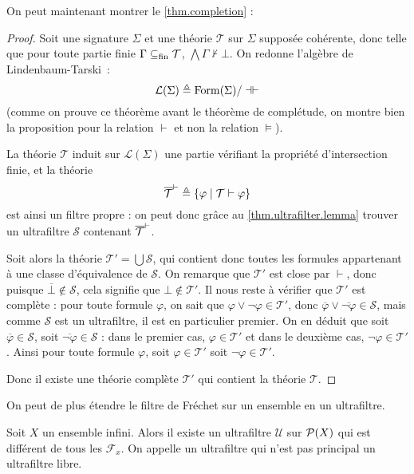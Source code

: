 On peut maintenant montrer le \cref{thm.completion} :

\begin{proof}
  Soit une signature $\Sigma$ et une théorie $\mathcal T$ sur $\Sigma$ supposée
  cohérente, donc telle que pour toute partie finie $\Gamma\subseteq_{\mathrm{fin}} \mathcal T$,
  $\bigwedge \Gamma \nvdash \bot$. On redonne l'algèbre de Lindenbaum-Tarski~:
  \[\mathcal L(\Sigma) \triangleq \operatorname{Form}(\Sigma)/\dashv\vdash\]
  (comme on prouve ce théorème avant le théorème de complétude, on montre bien
  la proposition pour la relation $\vdash$ et non la relation $\vDash$).

  La théorie $\mathcal T$ induit sur $\mathcal L(\Sigma)$ une partie vérifiant
  la propriété d'intersection finie, et la théorie
  \[\overline{\mathcal T}^{\vdash} \triangleq \{\varphi\mid \mathcal T \vdash \varphi\}\]
  est ainsi un filtre propre : on peut donc grâce au
  \cref{thm.ultrafilter.lemma} trouver un ultrafiltre $\mathcal S$ contenant
  $\overline{\mathcal T}^{\vdash}$.

  Soit alors la théorie $\mathcal T' = \bigcup\mathcal S$, qui contient donc
  toutes les formules appartenant à une classe d'équivalence de $\mathcal S$.
  On remarque que $\mathcal T'$ est close par $\vdash$, donc puisque
  $\overline\bot \notin\mathcal S$, cela signifie que $\bot\notin\mathcal T'$.
  Il nous reste à vérifier que $\mathcal T'$ est complète : pour toute
  formule $\varphi$, on sait que $\varphi\lor\lnot\varphi \in \mathcal T'$, donc
  $\overline{\varphi}\lor\overline{\lnot\varphi}\in\mathcal S$, mais
  comme $\mathcal S$ est un ultrafiltre, il est en particulier premier. On
  en déduit que soit $\overline\varphi \in \mathcal S$, soit
  $\overline{\lnot\varphi}\in \mathcal S$ : dans le premier cas,
  $\varphi\in \mathcal T'$ et dans le deuxième cas,
  $\lnot\varphi\in \mathcal T'$. Ainsi pour toute formule $\varphi$, soit
  $\varphi\in \mathcal T'$ soit $\lnot\varphi\in \mathcal T'$.

  Donc il existe une théorie complète $\mathcal T'$ qui contient la théorie
  $\mathcal T$.
\end{proof}

On peut de plus étendre le filtre de Fréchet sur un ensemble en un ultrafiltre.

\begin{proposition}
  Soit $X$ un ensemble infini. Alors il existe un ultrafiltre $\mathcal U$ sur
  $\mathcal{P}(X)$ qui est différent de tous les $\mathcal F_x$. On appelle un
  ultrafiltre qui n'est pas principal un ultrafiltre libre.
\end{proposition}

